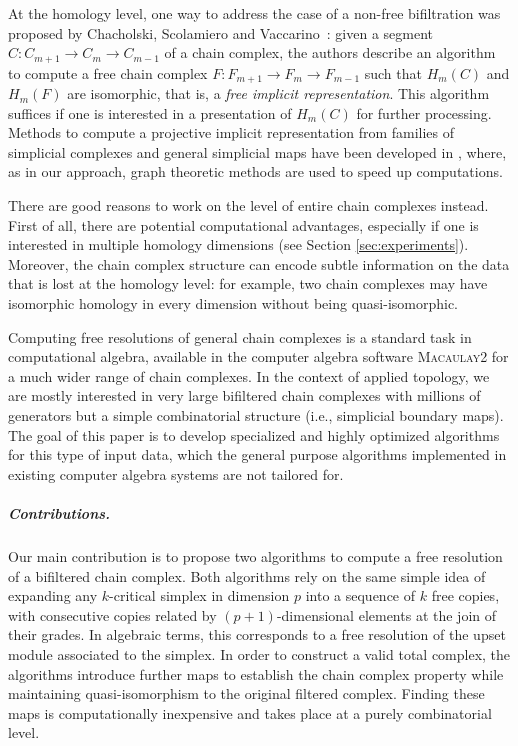 \documentclass[a4paper,UKenglish,cleveref,nolineno,autoref]{socg-lipics-v2021}
\newcommand{\define}[1]{\emph{#1}} %
\begin{document}
At the homology level, one way to address the case of a non-free bifiltration was proposed by Chacholski,
Scolamiero and Vaccarino~\cite{swedish}: given a segment  $C:C_{m+1}\to C_m\to C_{m-1}$ of a chain complex, the authors describe an algorithm to compute a free chain complex
$F:F_{m+1}\to F_m\to F_{m-1}$ such that $H_m(C)$ and $H_m(F)$ are isomorphic, that is, a \define{free implicit representation}.
This algorithm suffices if one is interested in a presentation
of $H_m(C)$ for further processing. Methods to compute a projective implicit representation from families of simplicial complexes and general simplicial maps have been developed in \cite{dey2025computingprojectiveimplicitrepresentations,dey_et_al:LIPIcs.SoCG.2024.51}, where, as in our approach, graph theoretic methods are used to speed up computations.

There are good reasons to work on the level of entire chain complexes instead.
First of all, there are potential computational advantages, especially if one is interested in multiple homology dimensions (see Section \ref{sec:experiments}). 
Moreover, the chain complex structure can encode subtle information on the data that is lost at the homology level: for example, two chain complexes may have isomorphic homology in every dimension without being quasi-isomorphic. 

Computing free resolutions of general chain complexes is a standard task in computational algebra, available in the computer algebra software \textsc{Macaulay2} for a much wider range of chain complexes.
In the context of applied topology, we are mostly interested in very large bifiltered chain complexes with millions of generators but a simple combinatorial structure (i.e., simplicial boundary maps).
The goal of this paper is to develop specialized and highly optimized algorithms for this type of input data, which the general purpose algorithms implemented in existing computer algebra systems are not tailored for.

\subparagraph{Contributions.}
%
Our main contribution is to propose two algorithms to compute a free resolution of a bifiltered chain complex. 
Both algorithms rely on the same simple idea of expanding any $k$-critical simplex in dimension $p$ into a sequence of $k$ free copies, with consecutive copies related by $(p+1)$-dimensional elements at the join of their grades.
In algebraic terms, this corresponds to a free resolution of the upset module associated to the simplex.
In order to construct a valid total complex,
the algorithms introduce further maps to establish the chain complex property while maintaining quasi-isomorphism to the original filtered complex.
Finding these maps is computationally inexpensive and takes place at a purely combinatorial level.
\end{document}
